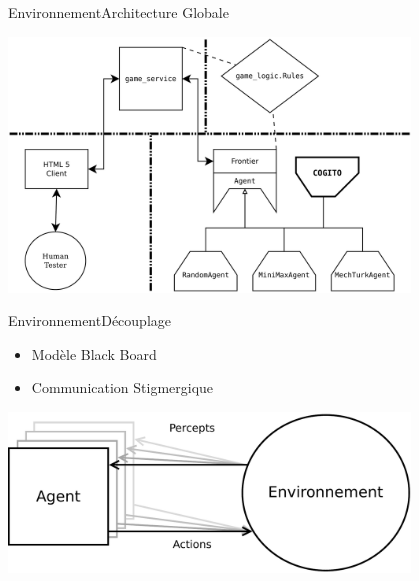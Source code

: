 \begin{frame}{Environnement}{Architecture Globale}
\begin{center}
\includegraphics[width=0.8\textwidth]{img/william/archi_full}\\
\end{center}
\end{frame}
\begin{frame}{Environnement}{Découplage}
\begin{itemize}
\item Modèle \og Black Board \fg{}
\item Communication \og Stigmergique \fg{}
\end{itemize}
\begin{center}
\includegraphics[width=0.8\textwidth]{img/william/agent_env}\\
\end{center}
\end{frame}
